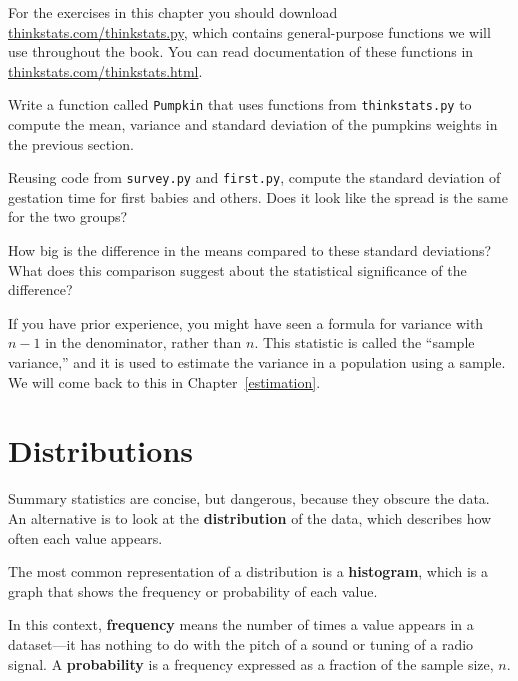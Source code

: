 \documentclass[12pt]{book}
\begin{document}
\begin{ex}
For the exercises in this chapter you should download
\url{thinkstats.com/thinkstats.py}, which contains general-purpose
functions we will use throughout the book.  You can read documentation
of these functions in \url{thinkstats.com/thinkstats.html}.


Write a function called
{\tt Pumpkin} that uses functions from {\tt thinkstats.py} to compute
the mean, variance and standard deviation of the pumpkins weights in
the previous section.
\end{ex}

\begin{ex}
Reusing code from {\tt survey.py} and {\tt first.py}, compute the
standard deviation of gestation time for first babies and others.
Does it look like the spread is the same for the two groups?


How big is the difference in the means compared to these standard
deviations?  What does this comparison suggest about the statistical
significance of the difference?
\end{ex}

If you have prior experience, you might have seen a 
formula for variance with $n-1$ in the denominator, rather than $n$.
This statistic is called the ``sample variance,'' and it is used
to estimate the variance in a population using a sample.  We will
come back to this in Chapter~\ref{estimation}.


\section{Distributions}
\label{distributions}

Summary statistics are concise, but dangerous, because they obscure
the data.  An alternative is to look at the {\bf distribution} of the
data, which describes how often each value appears.

The most common representation of a distribution is a {\bf histogram},
which is a graph that shows the frequency or probability
of each value.


In this context, {\bf frequency} means the number of times a value
appears in a dataset---it has nothing to do with the pitch of a sound
or tuning of a radio signal.  A {\bf probability} is a frequency expressed
as a fraction of the sample size, $n$.
\end{document}
